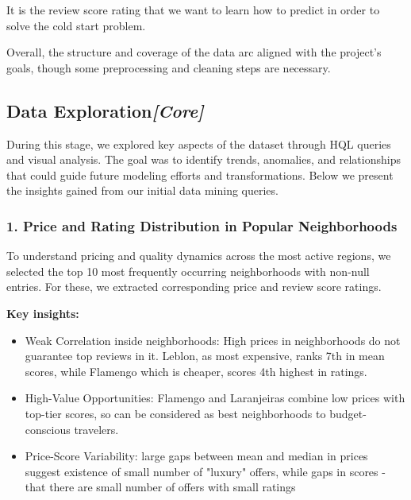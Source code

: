 It is the review score rating that we want to learn how to predict in order to solve the cold start problem.

Overall, the structure and coverage of the data arc aligned with the project's goals, though some preprocessing and cleaning steps are necessary.

\subsection{Data Exploration\textit{[Core]}}
\label{sec:dataExploration}

During this stage, we explored key aspects of the dataset through HQL queries and visual analysis. The goal was to identify trends, anomalies, and relationships that could guide future modeling efforts and transformations. Below we present the insights gained from our initial data mining queries.

\subsubsection*{1. Price and Rating Distribution in Popular Neighborhoods}

To understand pricing and quality dynamics across the most active regions, we selected the top 10 most frequently occurring neighborhoods with non-null entries. For these, we extracted corresponding price and review score ratings.

\vspace{0.5em}
\textbf{Key insights:}
\begin{itemize}
    \item Weak Correlation inside neighborhoods: High prices in neighborhoods do not guarantee top reviews in it. Leblon, as most expensive, ranks 7th in mean scores, while Flamengo which is cheaper, scores 4th highest in ratings.
    \item High-Value Opportunities: Flamengo and Laranjeiras combine low prices with top-tier scores, so can be considered as best neighborhoods to budget-conscious travelers.
    \item Price-Score Variability: large gaps between mean and median in prices suggest existence of small number of "luxury" offers, while gaps in scores - that there are small number of offers with small ratings
\end{itemize}

